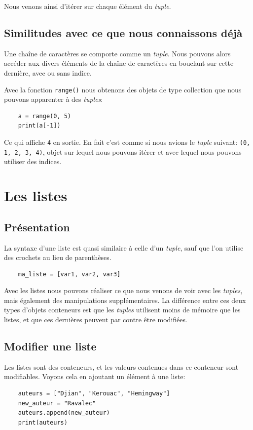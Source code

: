 \documentclass[a4paper,12pt]{book}
\begin{document}
Nous venons ainsi d'itérer sur chaque élément du \textit{tuple}.

\subsection*{Similitudes avec ce que nous connaissons déjà}
Une chaîne de caractères se comporte comme un \textit{tuple}. Nous pouvons alors accéder aux divers éléments de la chaîne de caractères en bouclant sur cette dernière, avec ou sans indice.
\medskip

Avec la fonction \texttt{range()} nous obtenons des objets de type collection que nous pouvons apparenter à des \textit{tuples}:
\begin{verbatim}
    a = range(0, 5)
    print(a[-1])
\end{verbatim}
\medskip

Ce qui affiche \texttt{4} en sortie. En fait c'est comme si nous avions le \textit{tuple} suivant: \texttt{(0, 1, 2, 3, 4)}, objet sur lequel nous pouvons itérer et avec lequel nous pouvons utiliser des indices.
\medskip

\section{Les listes}
\subsection*{Présentation}
La syntaxe d'une liste est quasi similaire à celle d'un \textit{tuple}, sauf que l'on utilise des crochets au lieu de parenthèses.
\begin{verbatim}
    ma_liste = [var1, var2, var3]
\end{verbatim}
\medskip

Avec les listes nous pouvons réaliser ce que nous venons de voir avec les \textit{tuples}, mais également des manipulations supplémentaires. La différence entre ces deux types d'objets conteneurs est que les \textit{tuples} utilisent moins de mémoire que les listes, et que ces dernières peuvent par contre être modifiées.
\medskip

\subsection*{Modifier une liste}
Les listes sont des conteneurs, et les valeurs contenues dans ce conteneur sont modifiables. Voyons cela en ajoutant un élément à une liste:
\begin{verbatim}
    auteurs = ["Djian", "Kerouac", "Hemingway"]
    new_auteur = "Ravalec"
    auteurs.append(new_auteur)
    print(auteurs)
\end{verbatim}
\medskip
\end{document}
